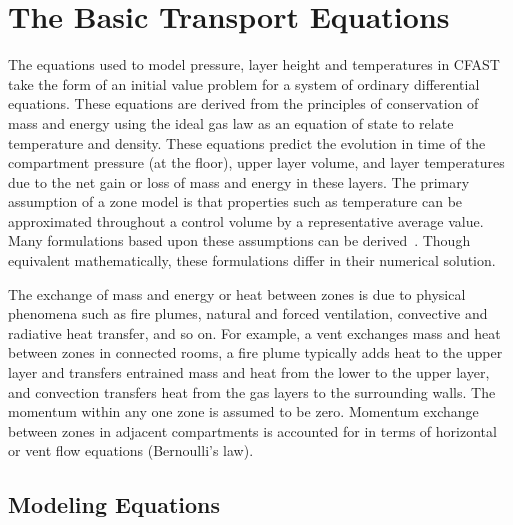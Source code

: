\documentclass[12pt,twoside]{book}
\begin{document}
%
%

\chapter{The Basic Transport Equations}
\label{sec:Theory_Chapter}

The equations used to model pressure, layer height and temperatures in CFAST take the form of an initial value problem for a system of ordinary differential equations. These equations are derived from the principles of conservation of mass and energy using the ideal gas law as an equation of state to relate temperature and density. These equations predict the evolution in time of the compartment pressure (at the floor), upper layer volume, and layer temperatures due to the net gain or loss of mass and energy in these layers. The primary assumption of a zone model is that properties such as temperature can be approximated throughout a control volume by a representative average value. Many formulations based upon these assumptions can be derived~\cite{Forney:1994}. Though equivalent mathematically, these formulations differ in their numerical solution.

The exchange of mass and energy or heat between zones is due to physical phenomena such as fire plumes, natural and forced ventilation, convective and radiative heat transfer, and so on. For example, a vent exchanges mass and heat between zones in connected rooms, a fire plume typically adds heat to the upper layer and transfers entrained mass and heat from the lower to the upper layer, and convection transfers heat from the gas layers to the surrounding walls.  The momentum within any one zone is assumed to be zero. Momentum exchange between zones in adjacent compartments is accounted for in terms of horizontal or vent flow equations (Bernoulli's law).

\newcommand{\qdot}{\dot{q}}
\section{Modeling Equations}
\label{sect:equations}
\end{document}
